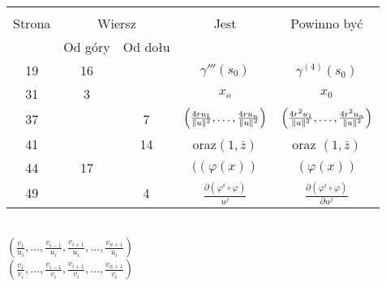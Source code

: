 \documentclass[a4paper,11pt]{article}
\begin{document}
\begin{center}

  \begin{tabular}{|c|c|c|c|c|}
    \hline
    & \multicolumn{2}{c|}{} & & \\
    Strona & \multicolumn{2}{c|}{Wiersz} & Jest
                              & Powinno być \\ \cline{2-3}
    & Od góry & Od dołu & & \\
    \hline
    19  & 16 & & $\gamma'''( s_{ 0 } )$ & $\gamma^{ (4) }( s_{ 0 } )$ \\
    31  &  3 & & $x_{ o }$ & $x_{ 0 }$ \\
    37  & & 7 & $\left( \frac{ 4 r u_{ 1 } }{ \lVert{  u  }\rVert^{ 2 } }, \ldots,
                \frac{ 4 r u_{ n } }{ \lVert{  u  }\rVert^{ 2 } } \right)$
           & $\left( \frac{ 4 r^{ 2 } u_{ 1 } }{ \lVert{  u  }\rVert^{ 2 } },
             \ldots, \frac{ 4 r^{ 2 } u_{ n } }{ \lVert{  u  }\rVert^{ 2 } }
             \right)$ \\
    41  & & 14 & oraz$( 1, \bar{ z } )$ & oraz $( 1, \bar{ z } )$ \\
    44  & 17 & & $( ( \varphi( x ) )$ & $( \varphi( x ) )$ \\
    49  & &  4 & $\frac{ \partial ( \varphi^{ i } \circ \varphi ) }{ u^{ j } }$
           & $\frac{ \partial ( \varphi^{ i } \circ \varphi ) }{ \partial u^{ j } }$ \\
    \hline
  \end{tabular}

\end{center}

\vspace{\spaceTwo}


\noindent
{} \\
\Jest
$( \frac { v_{ 1 } }{ u_{ i } }, \ldots, \frac{ v_{ i - 1 } }{ u_{ i } },
\frac{ v_{ i + 1 } }{ u_{ i } }, \ldots, \frac{ v_{ n + 1 } }{ u_{ i } } )$ \\
\Powin
$( \frac{ v_{ 1 } }{ v_{ i } }, \ldots, \frac{ v_{ i - 1 } }{ v_{ i } },
\frac{ v_{ i + 1 } }{ v_{ i } }, \ldots, \frac{ v_{ n + 1 } }{ v_{ i } } )$ \\


\end{document}
